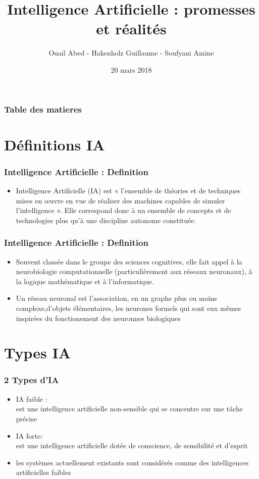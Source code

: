 \documentclass{beamer}
\title{Intelligence Artificielle : promesses et réalités}
\author{Ouail Abed - Hakenholz Guillaume - Soufyani Amine}
\date{20 mars 2018}
\begin{document}
	\begin{frame}
	\titlepage
	\end{frame}
	
	\begin{frame} %
	\frametitle{Table des matieres}
	\tableofcontents[currentsection] %
	\end{frame}
	
	\section{Définitions IA}
	\begin{frame}
	\frametitle{Intelligence Artificielle : Definition}
	\begin{itemize}
		\item Intelligence Artificielle (IA) est « l'ensemble de théories et de techniques mises en œuvre en vue de réaliser des machines capables de simuler l'intelligence ». Elle correspond donc à un ensemble 	de concepts et de technologies plus qu'à une discipline autonome constituée.
	\end{itemize}
	\end{frame}
	
	\begin{frame}
	\frametitle{Intelligence Artificielle : Definition}
	\begin{itemize}
		\itemsep2em
		\item Souvent classée dans le groupe des sciences cognitives, elle fait appel à la neurobiologie 					computationnelle (particulièrement aux réseaux neuronaux), à la logique mathématique et à 							l'informatique. 
		
		\item Un réseau neuronal est l’association, en un graphe plus ou moins 															complexe,d’objets élémentaires, les neurones formels qui sont eux mêmes inspirées du fonctionement 		des neuronnes biologiques
	\end{itemize}
	\end{frame}
	
	\section{Types IA}
	\begin{frame}
	\frametitle{2 Types d'IA}
	\begin{itemize}
		\itemsep0.5em
		\item IA faible  :\\
		est une intelligence artificielle non-sensible qui se concentre sur une tâche précise
		 
		 \item IA forte: \\
		est une intelligence artificielle dotée de conscience, de sensibilité et d'esprit
		\item les systèmes actuellement existants sont considérés comme des intelligences artificielles faibles
	\end{itemize}
	\end{frame}
	
\end{document}
